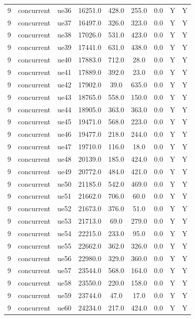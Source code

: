 \begin{table}[ht]
\begin{tabular}{|c|c|c|c|c|c|c|c|c|}
9 & concurrent & ue36 & 16251.0 & 428.0 & 255.0 & 0.0 & Y & Y \\
9 & concurrent & ue37 & 16497.0 & 326.0 & 323.0 & 0.0 & Y & Y \\
9 & concurrent & ue38 & 17026.0 & 531.0 & 423.0 & 0.0 & Y & Y \\
9 & concurrent & ue39 & 17441.0 & 631.0 & 438.0 & 0.0 & Y & Y \\
9 & concurrent & ue40 & 17883.0 & 712.0 & 28.0 & 0.0 & Y & Y \\
9 & concurrent & ue41 & 17889.0 & 392.0 & 23.0 & 0.0 & Y & Y \\
9 & concurrent & ue42 & 17902.0 & 39.0 & 635.0 & 0.0 & Y & Y \\
9 & concurrent & ue43 & 18765.0 & 558.0 & 150.0 & 0.0 & Y & Y \\
9 & concurrent & ue44 & 18905.0 & 363.0 & 363.0 & 0.0 & Y & Y \\
9 & concurrent & ue45 & 19471.0 & 568.0 & 223.0 & 0.0 & Y & Y \\
9 & concurrent & ue46 & 19477.0 & 218.0 & 244.0 & 0.0 & Y & Y \\
9 & concurrent & ue47 & 19710.0 & 116.0 & 18.0 & 0.0 & Y & Y \\
9 & concurrent & ue48 & 20139.0 & 185.0 & 424.0 & 0.0 & Y & Y \\
9 & concurrent & ue49 & 20772.0 & 484.0 & 421.0 & 0.0 & Y & Y \\
9 & concurrent & ue50 & 21185.0 & 542.0 & 469.0 & 0.0 & Y & Y \\
9 & concurrent & ue51 & 21662.0 & 706.0 & 60.0 & 0.0 & Y & Y \\
9 & concurrent & ue52 & 21673.0 & 376.0 & 51.0 & 0.0 & Y & Y \\
9 & concurrent & ue53 & 21713.0 & 69.0 & 279.0 & 0.0 & Y & Y \\
9 & concurrent & ue54 & 22215.0 & 233.0 & 95.0 & 0.0 & Y & Y \\
9 & concurrent & ue55 & 22662.0 & 362.0 & 326.0 & 0.0 & Y & Y \\
9 & concurrent & ue56 & 22980.0 & 329.0 & 360.0 & 0.0 & Y & Y \\
9 & concurrent & ue57 & 23544.0 & 568.0 & 164.0 & 0.0 & Y & Y \\
9 & concurrent & ue58 & 23550.0 & 220.0 & 158.0 & 0.0 & Y & Y \\
9 & concurrent & ue59 & 23744.0 & 47.0 & 17.0 & 0.0 & Y & Y \\
9 & concurrent & ue60 & 24234.0 & 217.0 & 424.0 & 0.0 & Y & Y \\

\end{tabular}
\end{table}
